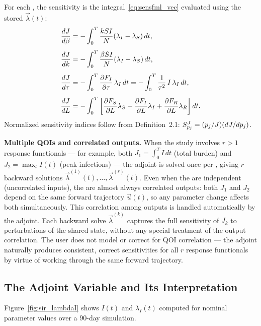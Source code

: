 For each \POI, the sensitivity is the integral~\eqref{eq:sensfml_vec}
evaluated using the stored $\vec{\lambda}(t)$:
\begin{align}
  \frac{d J}{d \beta} &= -\int_0^T \frac{kSI}{N}(\lambda_I - \lambda_S)\,dt,
  \label{eq:dJdbeta}\\[4pt]
  \frac{d J}{d k}     &= -\int_0^T \frac{\beta SI}{N}(\lambda_I - \lambda_S)\,dt,
  \label{eq:dJdk}\\[4pt]
  \frac{d J}{d \tau}  &= -\int_0^T \frac{\partial F_I}{\partial \tau}\,\lambda_I\,dt
                 = -\int_0^T \frac{1}{\tau^2}\,I\,\lambda_I\,dt,
  \label{eq:dJdtau}\\[4pt]
  \frac{d J}{d L}     &= -\int_0^T \left[\frac{\partial F_S}{\partial L}\lambda_S
                               + \frac{\partial F_I}{\partial L}\lambda_I
                               + \frac{\partial F_R}{\partial L}\lambda_R\right]dt.
  \label{eq:dJdL}
\end{align}
Normalized sensitivity indices follow from Definition~2.1:
$S_{p_j}^{J} = (p_j/J)(dJ/dp_j)$.

\medskip\noindent
\textbf{Multiple QOIs and correlated outputs.}
When the study involves $r > 1$ response functionals
--- for example, both $J_1 = \int_0^T I\,dt$ (total burden)
and $J_2 = \max_t I(t)$ (peak infections) ---
the adjoint is solved once per \QOI, giving $r$ backward solutions
$\vec{\lambda}^{(1)}(t), \ldots, \vec{\lambda}^{(r)}(t)$.
Even when the \POIs are independent (uncorrelated inputs),
the \QOIs are almost always correlated outputs: both $J_1$ and $J_2$
depend on the same forward trajectory $\vec{u}(t)$,
so any parameter change affects both simultaneously.
This correlation among outputs is handled automatically by the adjoint.
Each backward solve $\vec{\lambda}^{(k)}$ captures the full sensitivity
of $J_k$ to perturbations of the shared state, without any special
treatment of the output correlation.
The user does not model or correct for QOI correlation ---
the adjoint naturally produces consistent, correct sensitivities
for all $r$ response functionals by virtue of working through
the same forward trajectory.

\subsection{The Adjoint Variable and Its Interpretation}

Figure~\ref{fig:sir_lambdaI} shows $I(t)$ and $\lambda_I(t)$ computed
for nominal parameter values over a 90-day simulation.

